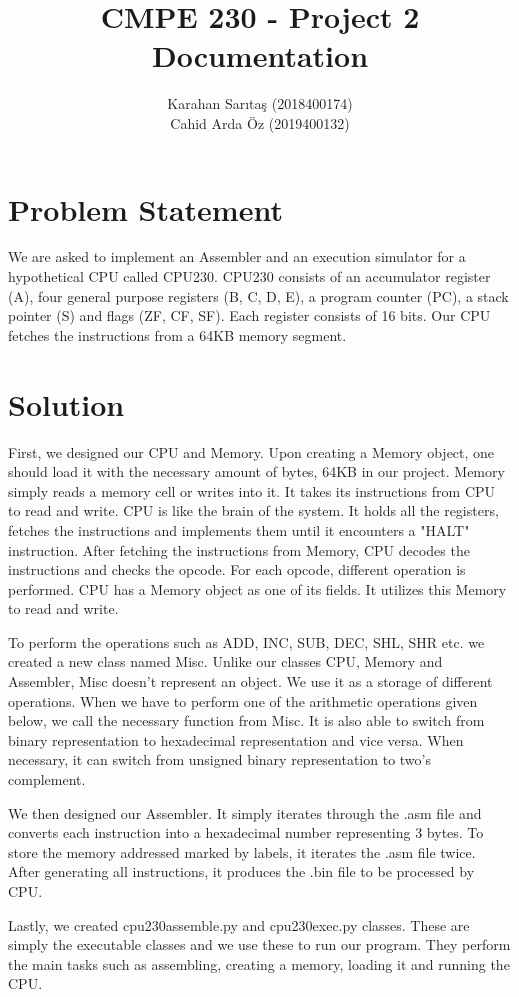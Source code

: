 \documentclass[12pt,a4paper]{article}
\title{CMPE 230 - Project 2 Documentation}
\author{Karahan Sarıtaş (2018400174) \\ Cahid Arda Öz (2019400132)}
\begin{document}
\maketitle

\tableofcontents

\section{Problem Statement}

We are asked to implement an Assembler and an execution simulator for a hypothetical CPU called CPU230. CPU230 consists of an accumulator register (A), four general purpose registers (B, C, D, E), a program counter (PC), a stack pointer (S) and flags (ZF, CF, SF). Each register consists of 16 bits. Our CPU fetches the instructions from a 64KB memory segment. \par

\section{Solution}
First, we designed our CPU and Memory. Upon creating a Memory object, one should load it with the necessary amount of bytes, 64KB in our project. Memory simply reads a memory cell or writes into it. It takes its instructions from CPU to read and write. CPU is like the brain of the system. It holds all the registers, fetches the instructions and implements them until it encounters a "HALT" instruction. After fetching the instructions from Memory, CPU decodes the instructions and checks the opcode. For each opcode, different operation is performed. CPU has a Memory object as one of its fields. It utilizes this Memory to read and write. \par
To perform the operations such as ADD, INC, SUB, DEC, SHL, SHR etc. we created a new class named Misc. Unlike our classes CPU, Memory and Assembler, Misc doesn't represent an object. We use it as a storage of different operations. When we have to perform one of the arithmetic operations given below, we call the necessary function from Misc. It is also able to switch from binary representation to hexadecimal representation and vice versa. When necessary, it can switch from unsigned binary representation to two's complement. \par
We then designed our Assembler. It simply iterates through the .asm file and converts each instruction into a hexadecimal number representing 3 bytes. To store the memory addressed marked by labels, it iterates the .asm file twice. After generating all instructions, it produces the .bin file to be processed by CPU. \par
Lastly, we created cpu230assemble.py and cpu230exec.py classes. These are simply the executable classes and we use these to run our program. They perform the main tasks such as assembling, creating a memory, loading it and running the CPU. \par
\end{document}
